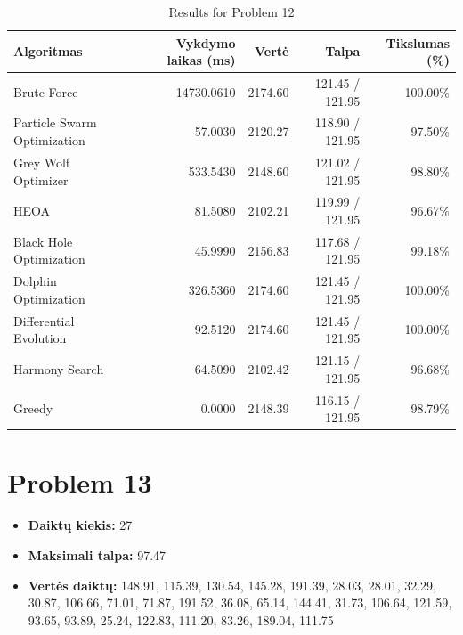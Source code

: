 \documentclass[a4paper,11pt]{article}
\begin{document}
\begin{table}[h!]
\centering
\begin{tabular}{lrrrr}
\toprule
\textbf{Algoritmas} & \textbf{Vykdymo laikas (ms)} & \textbf{Vertė} & \textbf{Talpa} & \textbf{Tikslumas (\%)} \\
\midrule
Brute Force & 14730.0610 & 2174.60 & 121.45 / 121.95 & 100.00\% \\
Particle Swarm Optimization & 57.0030 & 2120.27 & 118.90 / 121.95 & 97.50\% \\
Grey Wolf Optimizer & 533.5430 & 2148.60 & 121.02 / 121.95 & 98.80\% \\
HEOA & 81.5080 & 2102.21 & 119.99 / 121.95 & 96.67\% \\
Black Hole Optimization & 45.9990 & 2156.83 & 117.68 / 121.95 & 99.18\% \\
Dolphin Optimization & 326.5360 & 2174.60 & 121.45 / 121.95 & 100.00\% \\
Differential Evolution & 92.5120 & 2174.60 & 121.45 / 121.95 & 100.00\% \\
Harmony Search & 64.5090 & 2102.42 & 121.15 / 121.95 & 96.68\% \\
Greedy & 0.0000 & 2148.39 & 116.15 / 121.95 & 98.79\% \\
\bottomrule
\end{tabular}
\caption{Results for Problem 12}
\end{table}
\clearpage

\section*{Problem 13}
\begin{itemize}
    \item \textbf{Daiktų kiekis:} 27
    \item \textbf{Maksimali talpa:} 97.47
    \item \textbf{Vertės daiktų:} 148.91, 115.39, 130.54, 145.28, 191.39, 28.03, 28.01, 32.29, 30.87, 106.66, 71.01, 71.87, 191.52, 36.08, 65.14, 144.41, 31.73, 106.64, 121.59, 93.65, 93.89, 25.24, 122.83, 111.20, 83.26, 189.04, 111.75
\end{itemize}
\end{document}
